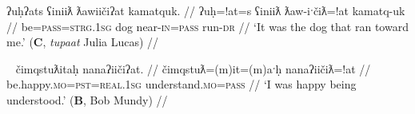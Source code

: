 \ex \label{ex:dograntowardme}
\begingl
\glpreamble ʔuḥʔats ʕiniiƛ ƛawiičiʔat kamatquk. //
\gla ʔuḥ=!at=s ʕiniiƛ ƛaw-iˑčiƛ=!at kamatq-uk //
\glb be=\textsc{pass}=\textsc{strg.1sg} dog near-\textsc{in}=\textsc{pass} run-\textsc{dr} //
\glft `It was the dog that ran toward me.' (\textbf{C}, \textit{tupaat} Julia Lucas) //
\endgl
\xe

\ex~ \label{ex:happyunderstood}
\begingl
\glpreamble čimqstuƛitaḥ nanaʔiičiʔat. //
\gla čimqstuƛ=(m)it=(m)aˑḥ nanaʔiičiƛ=!at //
\glb be.happy.\textsc{mo}=\textsc{pst}=\textsc{real.1sg} understand.\textsc{mo}=\textsc{pass} //
\glft `I was happy being understood.' (\textbf{B}, Bob Mundy) //
\endgl
\xe

\begin{comment}
\ex~ \label{ex:grizzlybearused}
\begingl
\glpreamble ʔaḥʔaaʔaƛsa huʔaas n̓aacsiičiƛ naani ʔuuḥw̓ałʔat naaniiłqḥ. //
\gla ʔaḥʔaaʔaƛ=sa huʔaas n̓aacsa-iˑčiƛ naani ʔuuḥw̓ał=!at naani-°ił-(q)ḥ //
\glb and.then=\textsc{neut.1sg} again see.\textsc{cv}-\textsc{in} grizzly.bear use=\textsc{pass} grizzly.bear-inside.\textsc{dr}-\textsc{link} //
\glft `And again I saw a grizzly bear used, a grizzly bear indoors.' (\textbf{C}, \textit{tupaat} Julia Lucas) //
\endgl
\xe
\end{comment}

\begin{comment}

In a construction that is unique to the passive, as far as I know, it is also possible for the passive to appear on both verbs when it semantically only affects one of them. I suspect the range of verbs where this is possible is restricted, but don't know for sure. In (\ref{ex:sistervisit2}), the passive attaches to perfective `become near,' giving the meaning `approach.' The other verb `be at' is not passivized: its typical argument structure is that its subject (in this case ``sister") is the figure and object (here, ``Port Alberni") is the ground. (\ref{ex:sistervisit1}) has the exact same structure, but the passive has been ``copied" onto the second verb in the construction, without altering its subject/object relations. This is perhaps related to the status of the passive in Nuuchahnulth having ``inverse-like" properties, as has been noted by previous scholars \citep{emanatian1988, braithwaite2003}.

\ex \label{ex:sistervisit2}
\begingl
\glpreamble ƛawiičʔats łuučm̓uupukqs hił c̓uumaʕaas. //
\gla ƛaw-°iˑčƛ=!at=s łuučm̓uup=uk=qas hił c̓uumaʕaas //
\glb near-\textsc{in}=\textsc{pass}=\textsc{strg.1sg} sister=\textsc{poss}=\textsc{defn.1sg} be.at port.alberni //
\glft `My sister came to visit at Port Alberni.' (\textbf{Q}, Sophie Billy) //
\endgl
\xe

\ex~ \label{ex:sistervisit1}
\begingl
\glpreamble ƛawiičʔats łuučm̓uupukqs hiłʔat c̓uumaʕaas. //
\gla ƛaw-°iˑčƛ=!at=s łuučm̓uup=uk=qas hił=!at c̓uumaʕaas //
\glb near-\textsc{in}=\textsc{pass}=\textsc{strg.1sg} sister=\textsc{poss}=\textsc{defn.1sg} be.at=\textsc{pass} port.alberni //
\glft `My sister came to visit at Port Alberni.' (\textbf{Q}, Sophie Billy) //
\endgl
\xe
\end{comment}

